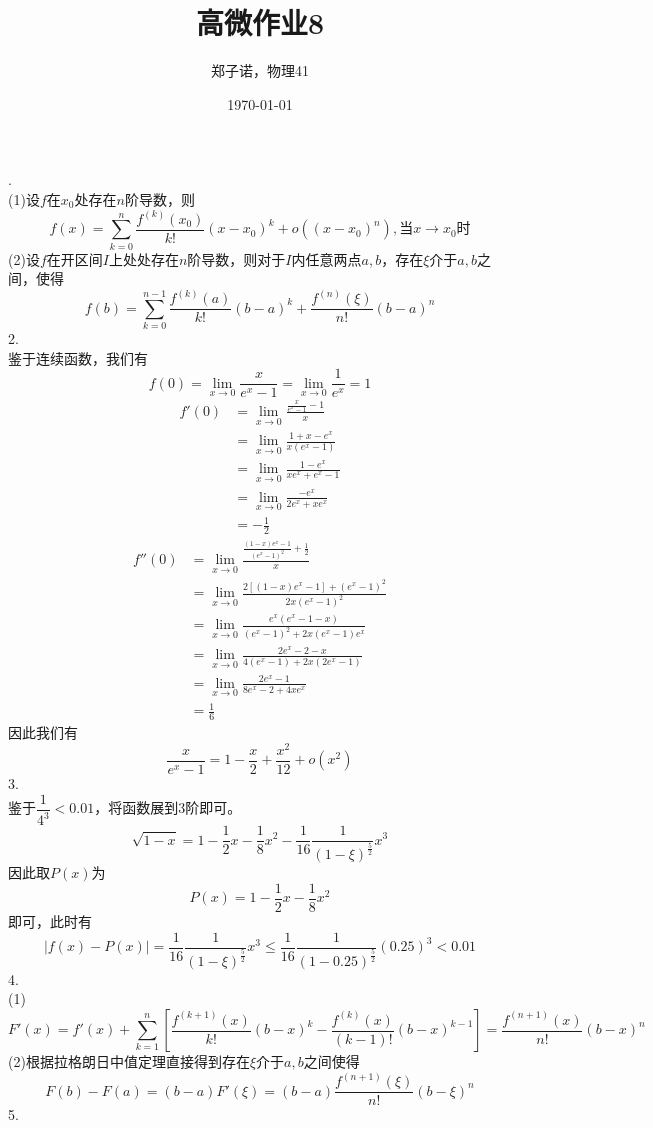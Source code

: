 \documentclass[utf8]{ctexart}
\title{高微作业8}
\author{郑子诺，物理41}
\date{\today}
\begin{document}
\maketitle
{}.\\
(1)设$f$在$x_0$处存在$n$阶导数，则
\[f(x)=\sum_{k=0}^n\frac{f^{(k)}(x_0)}{k!}(x-x_0)^k+o((x-x_0)^n),\text{当}x\rightarrow x_0\text{时}\]
(2)设$f$在开区间$I$上处处存在$n$阶导数，则对于$I$内任意两点$a,b$，存在$\xi$介于$a,b$之间，使得
\[f(b)=\sum_{k=0}^{n-1}\frac{f^{(k)}(a)}{k!}(b-a)^k+\frac{f^{(n)}(\xi)}{n!}(b-a)^n\]
2.\\
鉴于连续函数，我们有
\[f(0)=\lim_{x\rightarrow0}\frac{x}{e^x-1}=\lim_{x\rightarrow0}\frac{1}{e^x}=1\]
\begin{align*}
	f'(0)&=\lim_{x\rightarrow0}\frac{\frac{x}{e^x-1}-1}{x}\\
	&=\lim_{x\rightarrow0}\frac{1+x-e^x}{x(e^x-1)}\\
	&=\lim_{x\rightarrow0}\frac{1-e^x}{xe^x+e^x-1}\\
	&=\lim_{x\rightarrow0}\frac{-e^x}{2e^x+xe^x}\\
	&=-\frac{1}{2}
\end{align*}
\begin{align*}
	f''(0)&=\lim_{x\rightarrow0}\frac{\frac{(1-x)e^x-1}{(e^x-1)^2}+\frac{1}{2}}{x}\\
	&=\lim_{x\rightarrow0}\frac{2[(1-x)e^x-1]+(e^x-1)^2}{2x(e^x-1)^2}\\
	&=\lim_{x\rightarrow0}\frac{e^x(e^x-1-x)}{(e^x-1)^2+2x(e^x-1)e^x}\\
	&=\lim_{x\rightarrow0}\frac{2e^x-2-x}{4(e^x-1)+2x(2e^x-1)}\\
	&=\lim_{x\rightarrow0}\frac{2e^x-1}{8e^x-2+4xe^x}\\
	&=\frac{1}{6}
\end{align*}
因此我们有
\[\frac{x}{e^x-1}=1-\frac{x}{2}+\frac{x^2}{12}+o(x^2)\]
3.\\
鉴于$\dfrac{1}{4^3}<0.01$，将函数展到$3$阶即可。
\[\sqrt{1-x}=1-\frac{1}{2}x-\frac{1}{8}x^2-\frac{1}{16}\frac{1}{(1-\xi)^{\frac{5}{2}}}x^3\]
因此取$P(x)$为
\[P(x)=1-\frac{1}{2}x-\frac{1}{8}x^2\]即可，此时有
\[|f(x)-P(x)|=\frac{1}{16}\frac{1}{(1-\xi)^{\frac{5}{2}}}x^3\le\frac{1}{16}\frac{1}{(1-0.25)^{\frac{5}{2}}}(0.25)^3<0.01\]
4.\\
(1)
\[F'(x)=f'(x)+\sum_{k=1}^n[\frac{f^{(k+1)}(x)}{k!}(b-x)^k-\frac{f^{(k)}(x)}{(k-1)!}(b-x)^{k-1}]=\frac{f^{(n+1)}(x)}{n!}(b-x)^n\]
(2)根据拉格朗日中值定理直接得到存在$\xi$介于$a,b$之间使得
\[F(b)-F(a)=(b-a)F'(\xi)=(b-a)\frac{f^{(n+1)}(\xi)}{n!}(b-\xi)^n\]
5.\\
\end{document}
